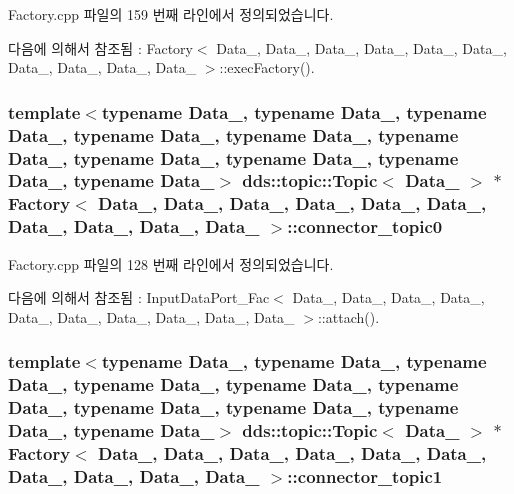 Factory.\+cpp 파일의 159 번째 라인에서 정의되었습니다.



다음에 의해서 참조됨 \+:  Factory$<$ Data\+\_, Data\+\_, Data\+\_, Data\+\_, Data\+\_, Data\+\_, Data\+\_, Data\+\_, Data\+\_, Data\+\_ $>$\+::exec\+Factory().

\subsubsection[{\texorpdfstring{connector\+\_\+topic0}{connector_topic0}}]{\setlength{\rightskip}{0pt plus 5cm}template$<$typename Data\+\_, typename Data\+\_, typename Data\+\_, typename Data\+\_, typename Data\+\_, typename Data\+\_, typename Data\+\_, typename Data\+\_, typename Data\+\_, typename Data\+\_$>$ dds\+::topic\+::\+Topic$<$ Data\+\_ $>$ $\ast$ {\bf Factory}$<$ Data\+\_, Data\+\_, Data\+\_, Data\+\_, Data\+\_, Data\+\_, Data\+\_, Data\+\_, Data\+\_, Data\+\_ $>$\+::connector\+\_\+topic0}\hypertarget{classFactory_a292d6100f4cee20be6f5f7b5f1ed13b5}{}\label{classFactory_a292d6100f4cee20be6f5f7b5f1ed13b5}


Factory.\+cpp 파일의 128 번째 라인에서 정의되었습니다.



다음에 의해서 참조됨 \+:  Input\+Data\+Port\+\_\+\+Fac$<$ Data\+\_, Data\+\_, Data\+\_, Data\+\_, Data\+\_, Data\+\_, Data\+\_, Data\+\_, Data\+\_, Data\+\_ $>$\+::attach().

\subsubsection[{\texorpdfstring{connector\+\_\+topic1}{connector_topic1}}]{\setlength{\rightskip}{0pt plus 5cm}template$<$typename Data\+\_, typename Data\+\_, typename Data\+\_, typename Data\+\_, typename Data\+\_, typename Data\+\_, typename Data\+\_, typename Data\+\_, typename Data\+\_, typename Data\+\_$>$ dds\+::topic\+::\+Topic$<$ Data\+\_ $>$ $\ast$ {\bf Factory}$<$ Data\+\_, Data\+\_, Data\+\_, Data\+\_, Data\+\_, Data\+\_, Data\+\_, Data\+\_, Data\+\_, Data\+\_ $>$\+::connector\+\_\+topic1}\hypertarget{classFactory_a744afdb2e49dc636774fdd4a2f6ec2d1}{}\label{classFactory_a744afdb2e49dc636774fdd4a2f6ec2d1}


